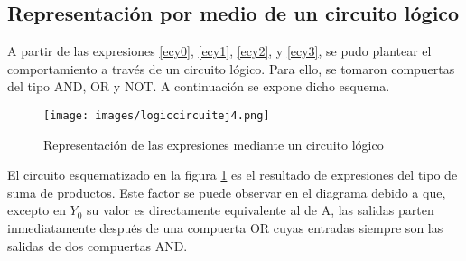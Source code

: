 \subsection{Representaci\'on por medio de un circuito l\'ogico}

\noindent
A partir de las expresiones \ref{ecy0},  \ref{ecy1}, \ref{ecy2}, y \ref{ecy3}, se pudo plantear el comportamiento a trav\'es de un circuito l\'ogico. Para ello, se tomaron compuertas del tipo AND, OR y NOT. A continuaci\'on se expone dicho esquema.

\begin{figure}[h!]
    \centering
    \texttt{[image: images/logiccircuitej4.png]}
    \caption{Representaci\'on de las expresiones mediante un circuito l\'ogico}
    \label{fig:circuito4fig}
\end{figure}

\noindent
El circuito esquematizado en la figura \ref{fig:circuito4fig} es el resultado de expresiones del tipo de suma de productos. Este factor se puede observar en el diagrama debido a que, excepto en $Y_0$ su valor es directamente equivalente al de A, las salidas parten inmediatamente despu\'es de una compuerta OR cuyas entradas siempre son las salidas de dos compuertas AND. 